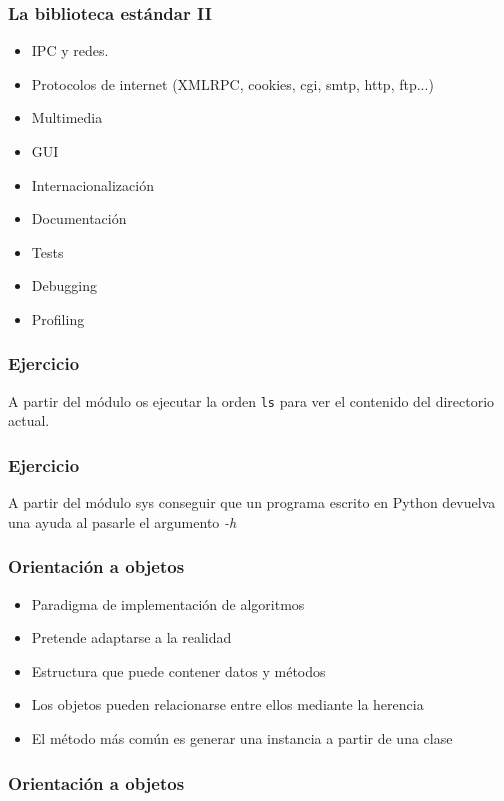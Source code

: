 \documentclass{beamer}
\begin{document}
\begin{frame}
  \frametitle{La biblioteca estándar II}
  \begin{itemize}
  \item IPC y redes.
  \item Protocolos de internet (XMLRPC, cookies, cgi, smtp, http, ftp...)
  \item Multimedia
  \item GUI
  \item Internacionalización
  \item Documentación
  \item Tests
  \item Debugging
  \item Profiling
  \end{itemize}
\end{frame}

\begin{frame}
  \frametitle{Ejercicio}
  A partir del módulo os ejecutar la orden \texttt{ls} para ver el
  contenido del directorio actual.
\end{frame}

\begin{frame}
  \frametitle{Ejercicio}
  A partir del módulo sys conseguir que un programa escrito en Python
  devuelva una ayuda al pasarle el argumento \emph{-h}
\end{frame}



\begin{frame}
  \frametitle{Orientación a objetos}
  \begin{itemize}
  \item Paradigma de implementación de algoritmos
  \item Pretende adaptarse a la realidad
  \item Estructura que puede contener datos y métodos
  \item Los objetos pueden relacionarse entre ellos mediante la
    herencia
  \item El método más común es generar una instancia a partir de una
    clase
  \end{itemize}
\end{frame}

\begin{frame}
  \frametitle{Orientación a objetos}
  \testcode
\end{frame}
\end{document}
